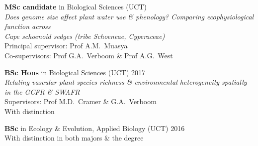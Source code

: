\begin{hangparas}{2em}{1}

\textbf{MSc candidate} in Biological Sciences (UCT)                           \\
  \hspace{2em} \textit{Does genome size affect plant water use \& phenology?
    Comparing ecophysiological function across}                               \\
  \hspace{2em} \textit{Cape schoenoid sedges (tribe Schoeneae, Cyperaceae)}   \\
  \hspace{2em} Principal supervisor: Prof A.M.~Muasya                         \\
  \hspace{2em} Co-supervisors: Prof G.A.~Verboom \& Prof A.G.~West

\textbf{BSc Hons} in Biological Sciences (UCT)                    \hfill 2017 \\
\hspace{2em} \textit{Relating vascular plant species richness \&
  environmental heterogeneity spatially in the GCFR \& SWAFR}                 \\
\hspace{2em} Supervisors: Prof M.D.~Cramer \& G.A.~Verboom                    \\
\hspace{2em} With distinction

\textbf{BSc} in Ecology \& Evolution, Applied Biology (UCT)       \hfill 2016 \\
\hspace{2em} With distinction in both majors \& the degree

\end{hangparas}

